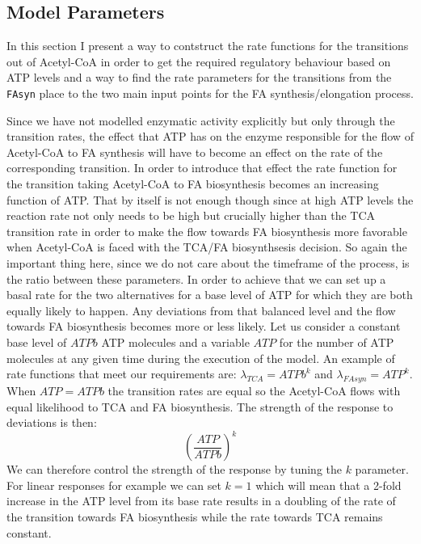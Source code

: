 \subsection{Model Parameters}
In this section I present a way to contstruct the
rate functions for the transitions out of Acetyl-CoA in order to get
the required regulatory behaviour based on ATP levels and a way to
find the rate parameters for the transitions from the \texttt{FAsyn} place
to the two main input points for the FA synthesis/elongation process.

Since we have not modelled enzymatic
activity explicitly but only through the transition rates, the effect that ATP has on the enzyme responsible
for the flow of Acetyl-CoA to FA synthesis will have to become an effect
on the rate of the corresponding transition. In order to introduce
that effect the rate function for the transition taking Acetyl-CoA to FA biosynthesis
becomes an increasing function of ATP. That by itself
is not enough though since at high ATP levels the reaction rate not only
needs to be high but crucially higher than the TCA transition rate in order to
make the flow towards FA biosynthesis more favorable when Acetyl-CoA
is faced with the TCA/FA biosynthsesis decision. So again the
important thing here, since we do not care about the timeframe of the
process, is the ratio between these parameters. In order to achieve
that we can set up a basal rate for the two alternatives for a
base level of ATP for which they are both equally likely to
happen. Any deviations from that balanced level and the flow towards
FA biosynthesis becomes more or less likely. Let us consider a
constant base level of $ATPb$ ATP molecules and a variable $ATP$ for the number
of ATP molecules at any given time during the execution of the
model. An example of rate functions that meet our requirements are:
$\lambda_{TCA} = ATPb^{k}$ and $\lambda_{FAsyn} =
ATP^{k}$. When $ATP=ATPb$ the transition rates are equal so the
Acetyl-CoA flows with equal likelihood to TCA and FA
biosynthesis. The strength of the response to deviations is then:
\begin{equation*}
\left ( \frac{ATP}{ATPb}\right)^{k}
\end{equation*}
We can therefore control the strength of the response by tuning the $k$
parameter. For linear responses for example we can set $k=1$ which
will mean that a 2-fold increase in the ATP level from its base rate
results in a doubling of the
rate of the transition towards FA biosynthesis while the rate towards
TCA remains constant.

